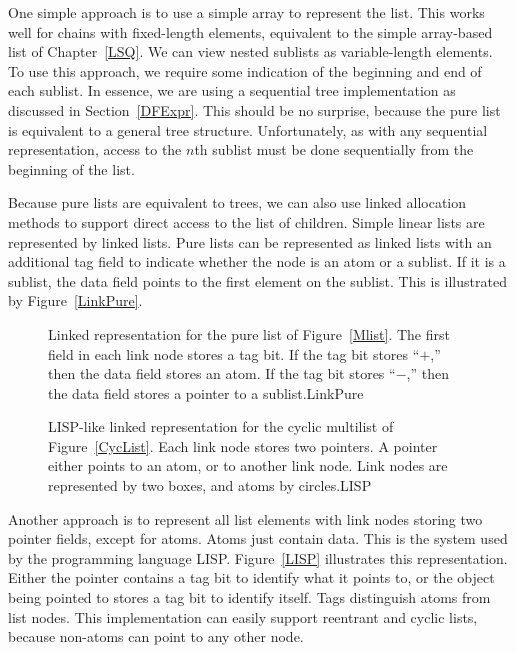 One simple approach is to use a simple array to represent the list.
This works well for chains with fixed-length elements, equivalent to
the simple array-based list of Chapter~\ref{LSQ}.
We can view nested sublists as variable-length
elements.
To use this approach, we require some
indication of the beginning and end of each sublist.
In essence, we are using a sequential tree implementation as
discussed in Section~\ref{DFExpr}.
This should be no surprise, because the pure list is equivalent to a
general tree structure.
Unfortunately, as with any sequential representation, access to the
$n$th sublist must be done sequentially from the beginning of the
list.

Because pure lists are equivalent to trees, we can also use linked
allocation methods to support direct access to the list of children.
Simple linear lists are represented by linked lists.
Pure lists can be represented as linked lists with an additional tag
field to indicate whether the node is an atom or a sublist.
If it is a sublist, the data field points to the first element on the
sublist.
This is illustrated by Figure~\ref{LinkPure}.

\begin{figure}
\vspace{-\bigskipamount}
{Linked representation for the pure list of
Figure~\ref{Mlist}.
The first field in each link node stores a tag bit.
If the tag bit stores ``$+$,'' then the data field stores an atom.
If the tag bit stores ``$-$,'' then the data field stores a pointer to a
sublist.}{LinkPure}
\smallskip
\end{figure}

\begin{figure}
\vspace{-\medskipamount}
{LISP-like linked representation for the cyclic multilist of
Figure~\ref{CycList}.
Each link node stores two pointers.
A pointer either points to an atom, or to another link node.
Link nodes are represented by two boxes, and atoms by circles.}{LISP}
\bigskip
\end{figure}

Another approach is to represent all list elements with link nodes
storing two pointer fields, except for atoms.
Atoms just contain data.
This is the system used by the programming language LISP.
Figure~\ref{LISP} illustrates this representation.
Either the pointer contains a tag bit to identify what it points to,
or the object being pointed to stores a tag bit to identify itself.
Tags distinguish atoms from list nodes.
This implementation can easily support reentrant and cyclic lists,
because non-atoms can point to any other node.

